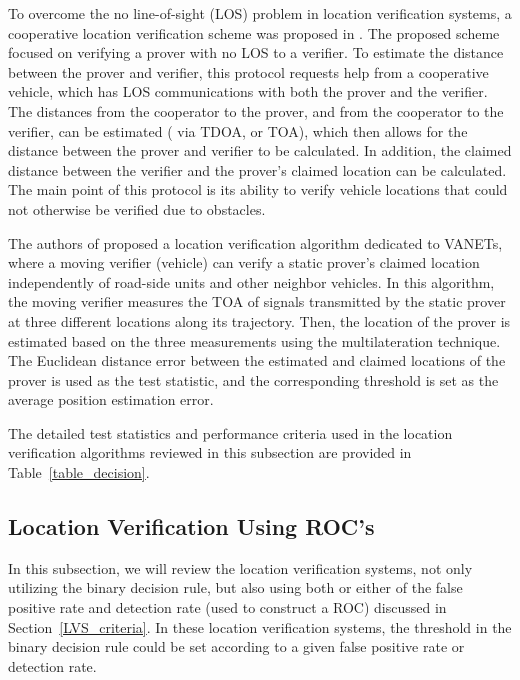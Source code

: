 \documentclass[journal]{IEEEtran}
\begin{document}
To overcome the no line-of-sight (LOS) problem in location verification systems, a cooperative location verification scheme was proposed in \cite{abumansoor2012secure}. The proposed scheme focused on verifying a prover with no LOS to a verifier. To estimate the distance between the prover and verifier, this protocol requests help from a cooperative vehicle, which has LOS communications with both the prover and the verifier. The distances from the cooperator to the prover, and from  the cooperator to the verifier, can be estimated  ( via TDOA, or  TOA), which then allows for the distance between the prover and verifier to be calculated. In addition, the claimed distance between the verifier and the prover's claimed location can be calculated. The main point of this protocol is its ability to verify vehicle locations that could not otherwise be verified due to obstacles.


The authors of \cite{das2013position} proposed a location verification algorithm dedicated to VANETs, where a moving verifier (vehicle) can verify a static prover's claimed location independently of road-side units and other neighbor vehicles. In this algorithm, the moving verifier  measures the TOA of signals transmitted by the static prover at three different locations along its trajectory. Then, the location of the prover is estimated based on the three measurements using the multilateration technique. The Euclidean  distance error between the estimated and claimed locations of the prover is used as the test statistic, and the corresponding threshold is set as the average position estimation error.

The detailed test statistics and performance criteria used in the location verification algorithms reviewed in this subsection are provided in Table~\ref{table_decision}.




\subsection{Location Verification Using ROC's}

In this subsection, we will review the location verification systems, not only utilizing the binary decision rule, but also using  both or either of the false positive rate and detection rate (used to construct a ROC) discussed in Section~\ref{LVS_criteria}. In these location verification systems, the threshold in the binary decision rule could be set according to a given false positive rate or detection rate.
\end{document}
